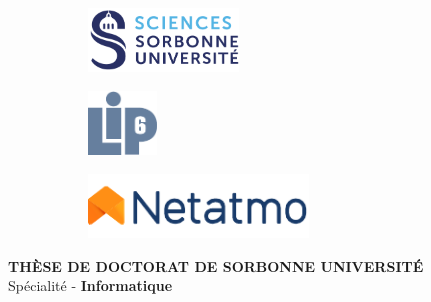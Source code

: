 

\newcommand{\jurymember}[6]{\hspace{1.5em}{#6} \textbf{{#1} {#2}}, {#3}, {#4} \hfill \textit{{#5}}\\}

\begin{titlepage}

    
    \begin{figure}
        \begin{subfigure}{.3\textwidth}
            \centering
            \includegraphics[height=1.7cm]{title_page/assets/sorbonne.pdf}
        \end{subfigure}\hfill
        \begin{subfigure}{.3\textwidth}
            \centering
            \includegraphics[height=1.7cm]{title_page/assets/LogoLIP6.pdf}
        \end{subfigure}\hfill
        \begin{subfigure}{.3\textwidth}
            \centering
            \includegraphics[height=1.7cm]{title_page/assets/netatmo_logo_color.pdf}
        \end{subfigure}
    \end{figure}
    
    \begin{center}
        {\large \textbf{THÈSE DE DOCTORAT DE SORBONNE UNIVERSITÉ}}\\

        \vspace{0.5em}
        {\large Spécialité - \textbf{Informatique}}\\


\end{center}
\end{titlepage}
